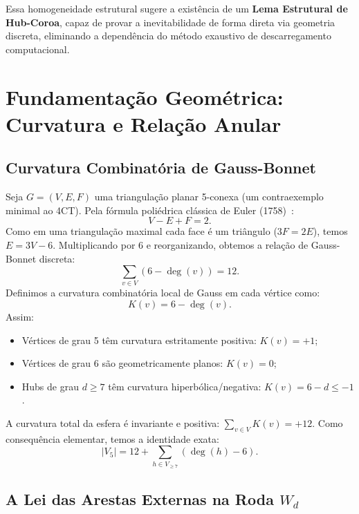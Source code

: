 \documentclass[11pt,a4paper]{article}
\theoremstyle{plain}
\theoremstyle{definition}
\begin{document}
Essa homogeneidade estrutural sugere a existência de um \textbf{Lema Estrutural de Hub-Coroa}, capaz de provar a inevitabilidade de forma direta via geometria discreta, eliminando a dependência do método exaustivo de descarregamento computacional.

\section{Fundamentação Geométrica: Curvatura e Relação Anular}

\subsection{Curvatura Combinatória de Gauss-Bonnet}

Seja $G = (V, E, F)$ uma triangulação planar 5-conexa (um contraexemplo minimal ao 4CT). Pela fórmula poliédrica clássica de Euler (1758)~\cite{euler1758}:
\begin{equation}
V - E + F = 2.
\end{equation}
Como em uma triangulação maximal cada face é um triângulo ($3F = 2E$), temos $E = 3V - 6$. Multiplicando por 6 e reorganizando, obtemos a relação de Gauss-Bonnet discreta:
\begin{equation}
\sum_{v \in V} (6 - \deg(v)) = 12.
\end{equation}
Definimos a curvatura combinatória local de Gauss em cada vértice como:
\begin{equation}
K(v) = 6 - \deg(v).
\end{equation}
Assim:
\begin{itemize}
    \item Vértices de grau 5 têm curvatura estritamente positiva: $K(v) = +1$;
    \item Vértices de grau 6 são geometricamente planos: $K(v) = 0$;
    \item Hubs de grau $d \ge 7$ têm curvatura hiperbólica/negativa: $K(v) = 6 - d \le -1$.
\end{itemize}
A curvatura total da esfera é invariante e positiva: $\sum_{v \in V} K(v) = +12$. Como consequência elementar, temos a identidade exata:
\begin{equation}
|V_5| = 12 + \sum_{h \in V_{\ge 7}} (\deg(h) - 6).
\label{eq:v5_exact}
\end{equation}

\subsection{A Lei das Arestas Externas na Roda \texorpdfstring{$W_d$}{Wd}}
\end{document}
